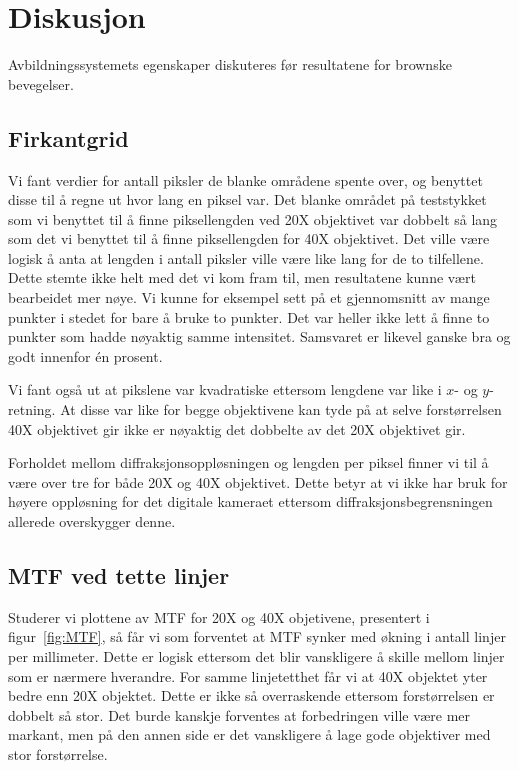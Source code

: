 \documentclass[a4paper,11pt, twocolumn]{article}
\begin{document}
\section{Diskusjon}
Avbildningssystemets egenskaper diskuteres før resultatene for brownske bevegelser.
\subsection{Firkantgrid}
Vi fant verdier for antall piksler de blanke områdene spente over, og benyttet disse til å regne ut hvor lang en piksel var. Det blanke området på teststykket som vi benyttet til å finne piksellengden ved 20X objektivet var dobbelt så lang som det vi benyttet til å finne piksellengden for 40X objektivet. Det ville være logisk å anta at lengden i antall piksler ville være like lang for de to tilfellene. Dette stemte ikke helt med det vi kom fram til, men resultatene kunne vært bearbeidet mer nøye. Vi kunne for eksempel sett på et gjennomsnitt av mange punkter i stedet for bare å bruke to punkter. Det var heller ikke lett å finne to punkter som hadde nøyaktig samme intensitet. Samsvaret er likevel ganske bra og godt innenfor \'en prosent.

Vi fant også ut at pikslene var kvadratiske ettersom lengdene var like i $x$- og $y$-retning. At disse var like for begge objektivene kan tyde på at selve forstørrelsen 40X objektivet gir ikke er nøyaktig det dobbelte av det 20X objektivet gir. 

Forholdet mellom diffraksjonsoppløsningen og lengden per piksel finner vi til å være over tre for både 20X og 40X objektivet. Dette betyr at vi ikke har bruk for høyere oppløsning for det digitale kameraet ettersom diffraksjonsbegrensningen allerede overskygger denne.

\subsection{MTF ved tette linjer}
Studerer vi plottene av MTF for 20X og 40X objetivene, presentert i figur~\ref{fig:MTF}, så får vi som forventet at MTF synker med økning i antall linjer per millimeter. Dette er logisk ettersom det blir vanskligere å skille mellom linjer som er nærmere hverandre. For samme linjetetthet får vi at 40X objektet yter bedre enn 20X objektet. Dette er ikke så overraskende ettersom forstørrelsen er dobbelt så stor. Det burde kanskje forventes at forbedringen ville være mer markant, men på den annen side er det vanskligere å lage gode objektiver med stor forstørrelse.  
\end{document}
